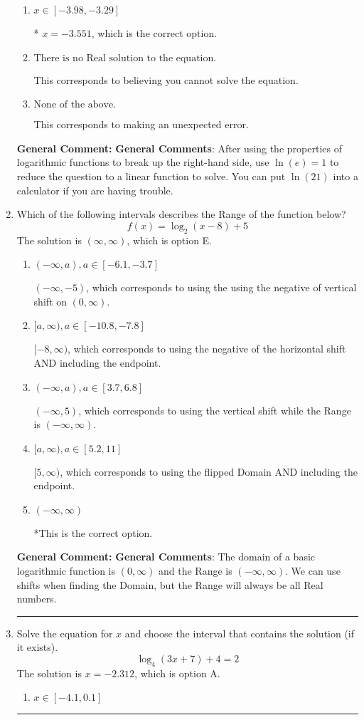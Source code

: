 \documentclass{extbook}[14pt]
\newcommand{\litem}[1]{\item #1

\rule{\textwidth}{0.4pt}}
\begin{document}
\begin{enumerate}
{\begin{enumerate}[label=\Alph*.]
$x = -0.773$, which corresponds to treating any root as a square root.
\item \( x \in [-3.98, -3.29] \)

* $x = -3.551$, which is the correct option.
\item \( \text{There is no Real solution to the equation.} \)

This corresponds to believing you cannot solve the equation.
\item \( \text{None of the above.} \)

This corresponds to making an unexpected error.
\end{enumerate}

\textbf{General Comment:} \textbf{General Comments}: After using the properties of logarithmic functions to break up the right-hand side, use $\ln(e) = 1$ to reduce the question to a linear function to solve. You can put $\ln(21)$ into a calculator if you are having trouble.
}
\litem{
Which of the following intervals describes the Range of the function below?
\[ f(x) = \log_2{(x-8)}+5 \]
The solution is \( (\infty, \infty) \), which is option E.\begin{enumerate}[label=\Alph*.]
\item \( (-\infty, a), a \in [-6.1, -3.7] \)

$(-\infty, -5)$, which corresponds to using the using the negative of vertical shift on $(0, \infty)$.
\item \( [a, \infty), a \in [-10.8, -7.8] \)

$[-8, \infty)$, which corresponds to using the negative of the horizontal shift AND including the endpoint.
\item \( (-\infty, a), a \in [3.7, 6.8] \)

$(-\infty, 5)$, which corresponds to using the vertical shift while the Range is $(-\infty, \infty)$.
\item \( [a, \infty), a \in [5.2, 11] \)

$[5, \infty)$, which corresponds to using the flipped Domain AND including the endpoint.
\item \( (-\infty, \infty) \)

*This is the correct option.
\end{enumerate}

\textbf{General Comment:} \textbf{General Comments}: The domain of a basic logarithmic function is $(0, \infty)$ and the Range is $(-\infty, \infty)$. We can use shifts when finding the Domain, but the Range will always be all Real numbers.
}
\litem{
Solve the equation for $x$ and choose the interval that contains the solution (if it exists).
\[ \log_{4}{(3x+7)}+4 = 2 \]
The solution is \( x = -2.312 \), which is option A.\begin{enumerate}[label=\Alph*.]
\item \( x \in [-4.1, 0.1] \)


\end{enumerate}}
\end{enumerate}
\end{document}

